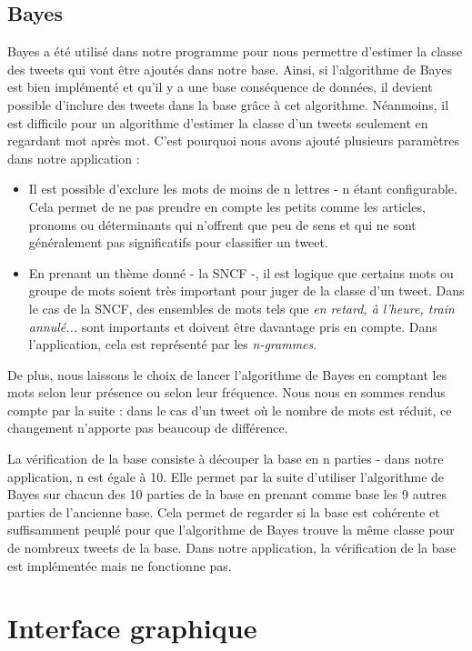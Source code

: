 \documentclass[a4paper,10pt]{report}
\begin{document}
    \subsection{Bayes}
      Bayes a été utilisé dans notre programme pour nous permettre d'estimer la classe des tweets qui vont être ajoutés dans notre base. Ainsi, si l'algorithme de Bayes est bien implémenté et qu'il y a une base conséquence de données, il devient possible d'inclure des tweets dans la base grâce à cet algorithme.
      Néanmoins, il est difficile pour un algorithme d'estimer la classe d'un tweets seulement en regardant mot après mot. C'est pourquoi nous avons ajouté plusieurs paramètres dans notre application :
      \begin{itemize}
	    \item Il est possible d'exclure les mots de moins de n lettres - n étant configurable. Cela permet de ne pas prendre en compte les petits comme les articles, pronoms ou déterminants qui n'offrent que peu de sens et qui ne sont généralement pas significatifs pour classifier un tweet. 
	    \item En prenant un thème donné - la SNCF -, il est logique que certains mots ou groupe de mots soient très important pour juger de la classe d'un tweet. Dans le cas de la SNCF, des ensembles de mots tels que \textit{en retard, à l'heure, train annulé...} sont importants et doivent être davantage pris en compte. Dans l'application, cela est représenté par les \textit{n-grammes}.
      \end{itemize}
      De plus, nous laissons le choix de lancer l'algorithme de Bayes en comptant les mots selon leur présence ou selon leur fréquence.
      Nous nous en sommes rendus compte par la suite : dans le cas d'un tweet où le nombre de mots est réduit, ce changement n'apporte pas beaucoup de différence.
      
      
      La vérification de la base consiste à découper la base en n parties - dans notre application, n est égale à 10.
      Elle permet par la suite d'utiliser l'algorithme de Bayes sur chacun des 10 parties de la base en prenant comme base les 9 autres parties de l'ancienne base.
      Cela permet de regarder si la base est cohérente et suffisamment peuplé pour que l'algorithme de Bayes trouve la même classe pour de nombreux tweets de la base.
      Dans notre application, la vérification de la base est implémentée mais ne fonctionne pas.

  \section{Interface graphique}
\end{document}

